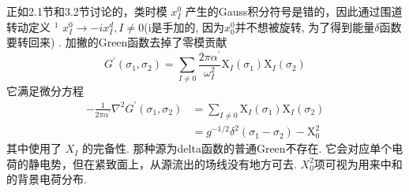 正如2.1节和3.2节讨论的，类时模 $x_{I}^{0}$ 产生的Gauss积分符号是错的，因此通过围道转动定义 $^{1}$ $x_{I}^{0} \rightarrow-i x_{I}^{d}, I \neq 0 $(i是手加的, 因为$x_0^0$并不想被旋转, 为了得到能量$\delta$函数要转回来) . 加撇的Green函数去掉了零模贡献
\begin{equation}
	G^{\prime}\left(\sigma_{1}, \sigma_{2}\right)=\sum_{I \neq 0} \frac{2 \pi \alpha^{\prime}}{\omega_{I}^{2}} \mathrm{X}_{I}\left(\sigma_{1}\right) \mathrm{X}_{I}\left(\sigma_{2}\right)
\end{equation}
它满足微分方程
\begin{equation}
	\begin{aligned}
		-\frac{1}{2 \pi \alpha^{\prime}} \nabla^{2} G^{\prime}\left(\sigma_{1}, \sigma_{2}\right) &=\sum_{I \neq 0} \mathrm{X}_{I}\left(\sigma_{1}\right) \mathrm{X}_{I}\left(\sigma_{2}\right) \\
		&=g^{-1 / 2} \delta^{2}\left(\sigma_{1}-\sigma_{2}\right)-\mathrm{X}_{0}^{2}
	\end{aligned}
\end{equation}
其中使用了 $X_{I}$ 的完备性. 那种源为delta函数的普通Green不存在. 它会对应单个电荷的静电势，但在紧致面上，从源流出的场线没有地方可去.  $X_{0}^{2}$项可视为用来中和的背景电荷分布.\\

